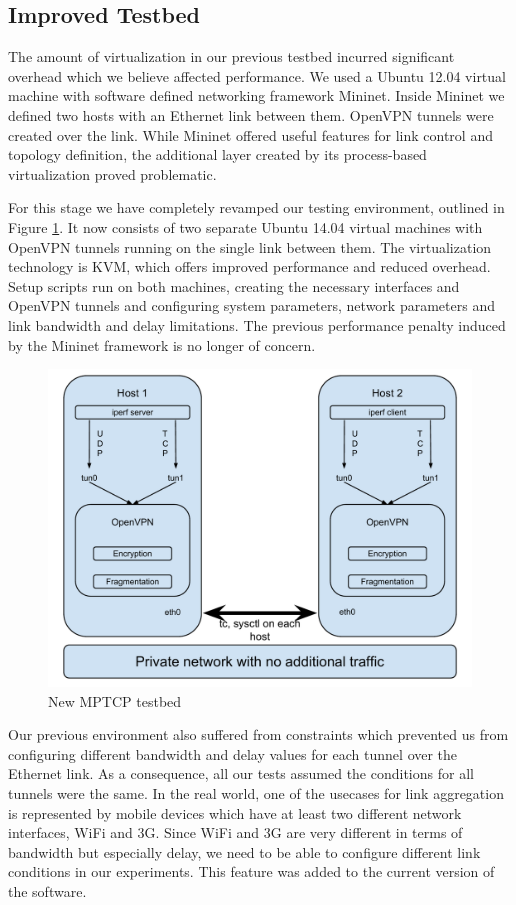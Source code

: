 \subsection{Improved Testbed}
The amount of virtualization in our previous testbed incurred significant overhead which we believe affected performance. We used a Ubuntu 12.04 virtual machine with software defined networking framework Mininet. Inside Mininet we defined two hosts with an Ethernet link between them. OpenVPN tunnels were created over the link. While Mininet offered useful features for link control and topology definition, the additional layer created by its process-based virtualization proved problematic.

For this stage we have completely revamped our testing environment, outlined
in Figure \ref{fig:testbed}. It now
consists of two separate Ubuntu 14.04 virtual machines with OpenVPN tunnels
running on the single link between them. The virtualization technology is KVM,
which offers improved performance and reduced overhead. Setup scripts run on
both machines, creating the necessary interfaces and OpenVPN tunnels and
configuring system parameters, network parameters and link bandwidth and delay
limitations. The previous performance penalty induced by the Mininet
framework is no longer of concern.

\begin{figure}[h]
  \centering
  \includegraphics[width=\textwidth]{img/mptcp-openvpn-bare}
  \caption{New MPTCP testbed}
  \label{fig:testbed}
\end{figure}

Our previous environment also suffered from constraints which prevented us from configuring different bandwidth and delay values for each tunnel over the Ethernet link. As a consequence, all our tests assumed the conditions for all tunnels were the same. In the real world, one of the usecases for link aggregation is represented by mobile devices which have at least two different network interfaces, WiFi and 3G. Since WiFi and 3G are very different in terms of bandwidth but especially delay, we need to be able to configure different link conditions in our experiments. This feature was added to the current version of the software.


